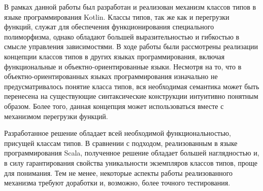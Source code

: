 \conclusion

В рамках данной работы был разработан и реализован механизм классов типов в языке программирования Kotlin. Классы типов, так же как и перегрузки функций, служат для обеспечения функционирования специального полиморфизма, однако обладают большей выразительностью и гибкостью в смысле управления зависимостями. В ходе работы были рассмотрены реализации концепции классов типов в других языках программирования, включая функциональные и объектно-ориентированные языки. Несмотря на то, что в объектно-ориентированных языках программирования изначально не предусматривалось понятие класса типов, вся необходимая семантика может быть перенесена на существующие синтаксические конструкции интуитивно понятным образом. Более того, данная концепция может использоваться вместе с механизмом перегрузки функций. 

Разработанное решение обладает всей необходимой функциональностью, присущей классам типов. В сравнении с подходом, реализованным в языке программирования Scala, полученное решение обладает большей наглядностью и, в силу гарантирования свойства уникальности экземпляров классов типов, проще для понимания. Тем не менее, некоторые аспекты работы реализованного механизма требуют доработки и, возможно, более точного тестирования.